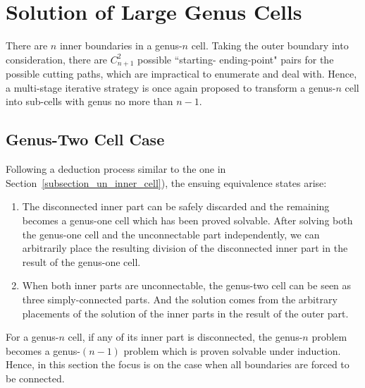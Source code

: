 \documentclass[conference]{IEEEtran}
\begin{document}
\section{Solution of Large Genus Cells}
\label{section_large_genus}
There are $n$ inner boundaries in a genus-$n$ cell. Taking the outer boundary into consideration, there are $C_{n+1}^2$ 
possible ``starting-  ending-point" pairs for the possible cutting paths, which are impractical to enumerate and deal with. 
Hence, a multi-stage iterative strategy is once again proposed to transform a genus-$n$ cell into sub-cells with genus no more than $n-1$. 

\subsection{Genus-Two Cell Case}
Following a deduction process similar to the one in Section~\ref{subsection_un_inner_cell}), the ensuing equivalence states arise:
\begin{enumerate}
\item The disconnected inner part can be safely discarded and the remaining becomes a genus-one cell which has been proved solvable. 
After solving both the genus-one cell and the unconnectable part independently, we can arbitrarily place the resulting division of the 
disconnected inner part in the result of the genus-one cell. 
\item When both inner parts are unconnectable, the genus-two cell can be seen as three simply-connected parts. And the solution comes from the arbitrary placements of the solution of the inner parts in the result of the outer part. 
\end{enumerate}

For a genus-$n$ cell, if any of its inner part is disconnected, the genus-$n$ problem becomes a genus-$(n-1)$ problem which is proven solvable under induction. Hence, in this section the focus is on the case when all boundaries are forced to be connected. 

\end{document}
